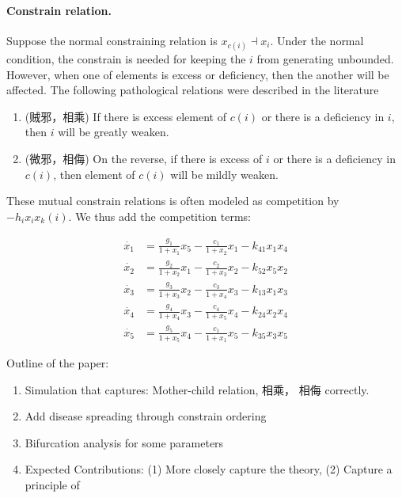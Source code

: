 \documentclass{article}
\begin{document}
\paragraph{Constrain  relation.}
Suppose the normal constraining relation is $x_{c(i)} \dashv x_i$.
Under the normal condition, the constrain is needed for keeping the $i$ from generating unbounded. However, when one of elements is excess or deficiency, then the another will be affected. The following pathological relations were described in the literature \cite{NeiJing,}
\begin{enumerate}
\item (贼邪，相乘) If there is excess element of $c(i)$ or there is a deficiency in $i$, then $i$ will be greatly weaken. 

\item (微邪，相侮) On the reverse, if there is excess of $i$ or there is a deficiency in $c(i)$, then element of $c(i)$ will be mildly weaken.  
\end{enumerate}

These mutual constrain relations is often modeled as competition by $ - h_i x_i x_k(i).$  We thus add the competition terms:

\begin{equation}
\begin{array}{rl}
\dot{x_1} &= \frac{g_1}{1+x_1}x_5  - \frac{c_1}{1+x_2} x_1 - k_{41} x_1 x_4\\
\dot{x_2} &= \frac{g_2}{1+x_2} x_1 - \frac{c_2}{1+x_3} x_2 - k_{52} x_5x_2\\
\dot{x_3} &= \frac{g_3}{1+x_3} x_2  - \frac{c_3}{1+x_4} x_3 - k_{13} x_1x_3\\
\dot{x_4} &= \frac{g_4}{1+x_4} x_3  - \frac{c_4}{1+x_5} x_4  - k_{24} x_2x_4\\
\dot{x_5} &= \frac{g_5}{1+x_5} x_4    - \frac{c_1}{1+x_1}x_5  - k_{35} x_3x_5
\end{array}
\end{equation}

Outline of the paper: 
\begin{enumerate}
\item Simulation that captures: Mother-child relation, 相乘， 相侮 correctly.
\item Add disease spreading through constrain ordering 
\item Bifurcation analysis for some parameters
\item Expected Contributions: (1) More closely capture the theory,  (2) Capture a principle of 
\end{enumerate}
\end{document}
